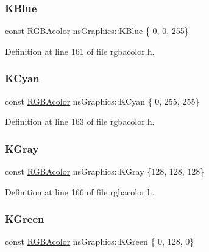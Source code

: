 \subsubsection{\texorpdfstring{K\+Blue}{KBlue}}
{\footnotesize\ttfamily const \hyperlink{classns_graphics_1_1_r_g_b_acolor}{R\+G\+B\+Acolor} ns\+Graphics\+::\+K\+Blue \{ 0, 0, 255\}}



Definition at line 161 of file rgbacolor.\+h.

\mbox{\label{namespacens_graphics_ac3f029049cd7ede1dfa2c788749029ad}} 
\subsubsection{\texorpdfstring{K\+Cyan}{KCyan}}
{\footnotesize\ttfamily const \hyperlink{classns_graphics_1_1_r_g_b_acolor}{R\+G\+B\+Acolor} ns\+Graphics\+::\+K\+Cyan \{ 0, 255, 255\}}



Definition at line 163 of file rgbacolor.\+h.

\mbox{\label{namespacens_graphics_a96ad8f5e0a09dba209c3359c277dcc6f}} 
\subsubsection{\texorpdfstring{K\+Gray}{KGray}}
{\footnotesize\ttfamily const \hyperlink{classns_graphics_1_1_r_g_b_acolor}{R\+G\+B\+Acolor} ns\+Graphics\+::\+K\+Gray \{128, 128, 128\}}



Definition at line 166 of file rgbacolor.\+h.

\mbox{\label{namespacens_graphics_ad2a6c119991dbf9f510d68a420524704}} 
\subsubsection{\texorpdfstring{K\+Green}{KGreen}}
{\footnotesize\ttfamily const \hyperlink{classns_graphics_1_1_r_g_b_acolor}{R\+G\+B\+Acolor} ns\+Graphics\+::\+K\+Green \{ 0, 128, 0\}}



